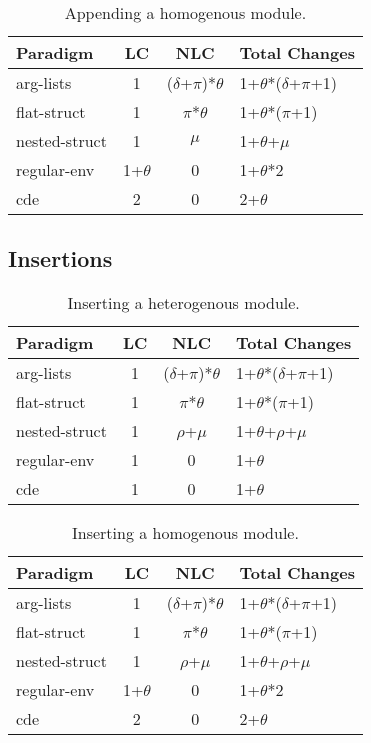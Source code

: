 \begin{table}
\centering
\begin{tabular*}{0.45\textwidth}{lccl}
\toprule
Paradigm    & LC & NLC &Total Changes\\
\midrule
arg-lists      &  1 & ($\delta$+$\pi$)*$\theta$ & 1+$\theta$*($\delta$+$\pi$+1)  \\
flat-struct  &  1 & $\pi$*$\theta$ & 1+$\theta$*($\pi$+1)  \\
nested-struct    &  1 & $\mu$ & 1+$\theta$+$\mu$  \\
regular-env    &  1+$\theta$ & 0 & 1+$\theta$*2 \\
cde &  2 & 0 & 2+$\theta$  \\
\bottomrule
\end{tabular*}
\caption{Appending a homogenous module.}
\label{hom:app}
\end{table}

\subsection{Insertions}


\begin{table}
\centering
\begin{tabular*}{0.45\textwidth}{lccl}
\toprule
Paradigm    & LC & NLC & Total Changes\\
\midrule
arg-lists      &  1 & ($\delta$+$\pi$)*$\theta$ & 1+$\theta$*($\delta$+$\pi$+1)  \\
flat-struct  &  1 & $\pi$*$\theta$ & 1+$\theta$*($\pi$+1)  \\
nested-struct    &  1 & $\rho$+$\mu$ & 1+$\theta$+$\rho$+$\mu$  \\
regular-env    &  1 & 0&1+$\theta$ \\
cde &  1 & 0 & 1+$\theta$  \\
\bottomrule
\end{tabular*}
\caption{Inserting a heterogenous module.}
\label{het:ins}
\end{table}


\begin{table}
\centering
\begin{tabular*}{0.45\textwidth}{lccl}
\toprule
Paradigm    & LC & NLC & Total Changes\\
\midrule
arg-lists      &  1 & ($\delta$+$\pi$)*$\theta$& 1+$\theta$*($\delta$+$\pi$+1)  \\
flat-struct  &  1 & $\pi$*$\theta$ & 1+$\theta$*($\pi$+1)  \\
nested-struct    &  1 & $\rho$+$\mu$ & 1+$\theta$+$\rho$+$\mu$  \\
regular-env    &  1+$\theta$ & 0 & 1+$\theta$*2 \\
cde &  2 & 0 & 2+$\theta$  \\
\bottomrule
\end{tabular*}
\caption{Inserting a homogenous module.}
\label{hom:ins}
\end{table}



